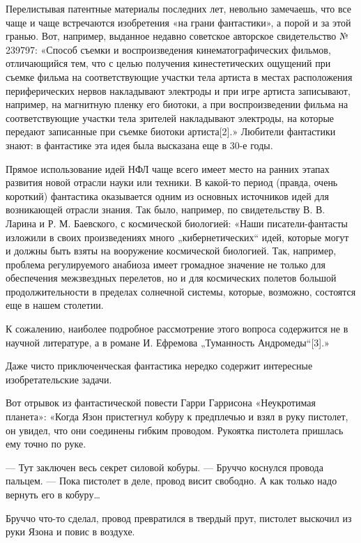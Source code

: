 Перелистывая патентные материалы  последних лет,  невольно замечаешь,  что
все чаще и чаще встречаются изобретения  «на грани фантастики», а порой  и
за этой  гранью.  Вот,  например,  выданное  недавно  советское  авторское
свидетельство    №    239797:    «Способ    съемки    и    воспроизведения
кинематографических фильмов,  отличающийся  тем,  что  с  целью  получения
кинестетических ощущений при съемке фильма на соответствующие участки тела
артиста в местах расположения периферических нервов накладывают  электроды
и при игре артиста записывают, например, на магнитную пленку его  биотоки,
а при  воспроизведении фильма  на  соответствующие участки  тела  зрителей
накладывают электроды, на которые  передают записанные при съемке  биотоки
артиста[2].» Любители  фантастики  знают:  в  фантастике  эта  идея  была
высказана еще в 30-е годы.

Прямое использование  идей НФЛ  чаще всего  имеет место  на ранних  этапах
развития новой отрасли науки или техники. В какой-то период (правда, очень
короткий) фантастика  оказывается одним  из основных  источников идей  для
возникающей отрасли знания.  Так было,  например, по  свидетельству В.  В.
Ларина и Р. М. Баевского, с космической биологией: «Наши писатели-фантасты
изложили в своих произведениях много „кибернетических“ идей, которые могут
и должны быть  взяты на вооружение  космической биологией. Так,  например,
проблема регулируемого  анабиоза имеет  громадное значение  не только  для
обеспечения межзвездных перелетов,  но и для  космических полетов  большой
продолжительности  в  пределах   солнечной  системы,  которые,   возможно,
состоятся еще в нашем столетии.

К сожалению, наиболее подробное рассмотрение этого вопроса содержится не в
научной литературе, а в романе И. Ефремова „Туманность Андромеды“[3].»

Даже  чисто   приключенческая  фантастика   нередко  содержит   интересные
изобретательские задачи.

Вот  отрывок  из  фантастической  повести  Гарри  Гаррисона   «Неукротимая
планета»: «Когда  Язон  пристегнул  кобуру  к предплечью  и  взял  в  руку
пистолет, он увидел, что они соединены гибким проводом. Рукоятка пистолета
пришлась ему точно по руке.

— Тут  заключен весь  секрет  силовой кобуры.  — Бруччо  коснулся  провода
пальцем. — Пока пистолет в деле, провод висит свободно. А как только  надо
вернуть его в кобуру…

Бруччо что-то сделал, провод превратился в твердый прут, пистолет выскочил
из руки Язона и повис в воздухе.


